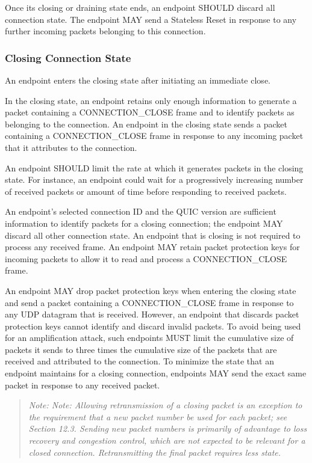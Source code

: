 \documentclass{article}
\begin{document}
Once its closing or draining state ends, an endpoint SHOULD discard all connection state.  The endpoint MAY send a Stateless Reset in response to any further incoming packets belonging to this connection.

\subsubsection{Closing Connection State}

An endpoint enters the closing state after initiating an immediate close.

In the closing state, an endpoint retains only enough information to generate a packet containing a CONNECTION\_CLOSE frame and to identify packets as belonging to the connection.  An endpoint in the closing state sends a packet containing a CONNECTION\_CLOSE frame in response to any incoming packet that it attributes to the connection.

An endpoint SHOULD limit the rate at which it generates packets in the closing state.  For instance, an endpoint could wait for a progressively increasing number of received packets or amount of time before responding to received packets.

An endpoint's selected connection ID and the QUIC version are sufficient information to identify packets for a closing connection; the endpoint MAY discard all other connection state.  An endpoint that is closing is not required to process any received frame.  An endpoint MAY retain packet protection keys for incoming packets to allow it to read and process a CONNECTION\_CLOSE frame.

An endpoint MAY drop packet protection keys when entering the closing state and send a packet containing a CONNECTION\_CLOSE frame in response to any UDP datagram that is received.  However, an endpoint that discards packet protection keys cannot identify and discard invalid packets.  To avoid being used for an amplification attack, such endpoints MUST limit the cumulative size of packets it sends to three times the cumulative size of the packets that are received and attributed to the connection.  To minimize the state that an endpoint maintains for a closing connection, endpoints MAY send the exact same packet in response to any received packet.

\begin{quote}
\textit{Note: Note: Allowing retransmission of a closing packet is an exception to the requirement that a new packet number be used for each packet; see Section 12.3.  Sending new packet numbers is primarily of advantage to loss recovery and congestion control, which are not expected to be relevant for a closed connection.  Retransmitting the final packet requires less state.}
\end{quote}
\end{document}
